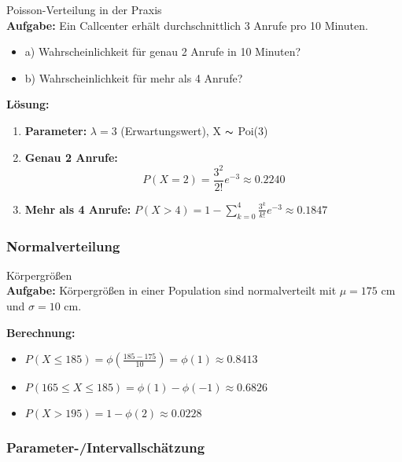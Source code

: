 \begin{example}{Poisson-Verteilung in der Praxis}\\
\textbf{Aufgabe:} Ein Callcenter erhält durchschnittlich 3 Anrufe pro 10 Minuten.
\begin{itemize}
\item a) Wahrscheinlichkeit für genau 2 Anrufe in 10 Minuten?
\item b) Wahrscheinlichkeit für mehr als 4 Anrufe?
\end{itemize}

\textbf{Lösung:}
\begin{enumerate}
\item \textbf{Parameter:} $\lambda = 3$ (Erwartungswert), X $\thicksim$ Poi(3)

\item \textbf{Genau 2 Anrufe:}
   $$P(X=2) = \frac{3^2}{2!}e^{-3} \approx 0.2240$$ 

\item \textbf{Mehr als 4 Anrufe:}
   $P(X>4) = 1 - \sum_{k=0}^4 \frac{3^k}{k!}e^{-3} \approx 0.1847$
\end{enumerate}
\end{example}

\subsubsection{Normalverteilung}

\begin{example}{Körpergrößen}\\
\textbf{Aufgabe:} Körpergrößen in einer Population sind normalverteilt mit $\mu = 175$ cm und $\sigma = 10$ cm.

\textbf{Berechnung:}
\begin{itemize}
\item $P(X \leq 185) = \phi(\frac{185-175}{10}) = \phi(1) \approx 0.8413$
\item $P(165 \leq X \leq 185) = \phi(1) - \phi(-1) \approx 0.6826$
\item $P(X > 195) = 1 - \phi(2) \approx 0.0228$
\end{itemize}
\end{example}

\subsubsection{Parameter-/Intervallschätzung}

